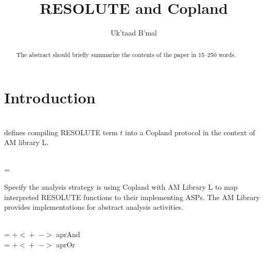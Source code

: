 \documentclass[runningheads]{llncs}
\theoremstyle{definition}
\begin{document}
%
\title{RESOLUTE and Copland%
}
%
%
\author{Uk'taad B'mal}
%
%
%
\maketitle              %
%
\begin{abstract}
The abstract should briefly summarize the contents of the paper in
15--250 words.

\end{abstract}
%
%
%
\section{Introduction}

\reservestyle{\command}{\textsf}

\begin{definition}[Compilation]\\
   defines compiling RESOLUTE term $t$ into a Copland
  protocol in the context of AM library L.
\end{definition}

\begin{definition}[Strategy] \\
   = 
\end{definition}

Specify the analysis strategy is using Copland with AM Library L to
map interpreted RESOLUTE functions to their implementing ASPs.  The AM
Library provides implementations for abstract analysis activities.

\begin{definition} \\
   =  $\mathsf{+\!<\!+}$
   $->$ aprAnd \\
   =  $\mathsf{+\!<\!+}$
   $->$ aprOr
\end{definition}
\end{document}

